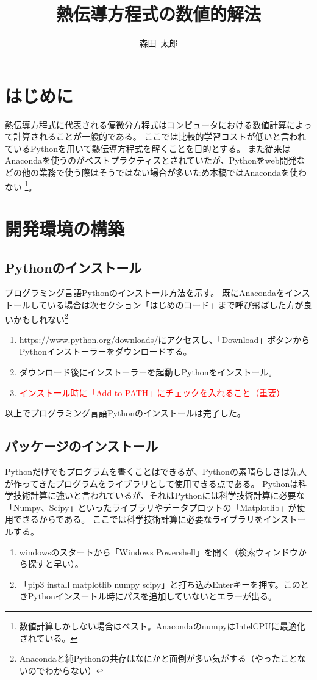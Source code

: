 \documentclass[]{article}
\title{熱伝導方程式の数値的解法}
\author{森田~太郎}
\date{}
\begin{document}
	\maketitle
	\section{はじめに}
	熱伝導方程式に代表される偏微分方程式はコンピュータにおける数値計算によって計算されることが一般的である。
	ここでは比較的学習コストが低いと言われているPythonを用いて熱伝導方程式を解くことを目的とする。
	また従来はAnacondaを使うのがベストプラクティスとされていたが、Pythonをweb開発などの他の業務で使う際はそうではない場合が多いため本稿ではAnacondaを使わない
	\footnote{数値計算しかしない場合はベスト。AnacondaのnumpyはIntelCPUに最適化されている。}。

	\section{開発環境の構築}
	\subsection{Pythonのインストール}
	プログラミング言語Pythonのインストール方法を示す。
	既にAnacondaをインストールしている場合は次セクション「はじめのコード」まで呼び飛ばした方が良いかもしれない\footnote{Anacondaと純Pythonの共存はなにかと面倒が多い気がする（やったことないのでわからない）}
	\begin{enumerate}
		\item \url{https://www.python.org/downloads/}にアクセスし、「Download」ボタンからPythonインストーラーをダウンロードする。
		\item ダウンロード後にインストーラーを起動しPythonをインストール。
		\item \textcolor{red}{インストール時に「Add to PATH」にチェックを入れること（重要）}
	\end{enumerate}
	以上でプログラミング言語Pythonのインストールは完了した。

	\subsection{パッケージのインストール}
	Pythonだけでもプログラムを書くことはできるが、Pythonの素晴らしさは先人が作ってきたプログラムをライブラリとして使用できる点である。
	Pythonは科学技術計算に強いと言われているが、それはPythonには科学技術計算に必要な「Numpy、Scipy」といったライブラリやデータプロットの「Matplotlib」が使用できるからである。
	ここでは科学技術計算に必要なライブラリをインストールする。
	\begin{enumerate}
		\item windowsのスタートから「Windows Powershell」を開く（検索ウィンドウから探すと早い）。
		\item 「pip3 install matplotlib numpy scipy」と打ち込みEnterキーを押す。このときPythonインスートル時にパスを追加していないとエラーが出る。
	\end{enumerate}
\end{document}
